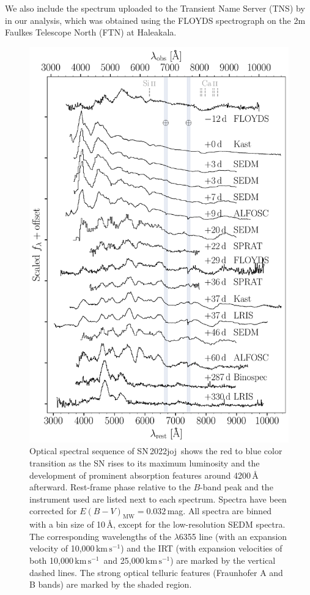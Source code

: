 \documentclass[twocolumn]{aastex631}
\newcommand{\sn}{SN\,2022joj}
\newcommand{\kms}{$\mathrm{km}\,\mathrm{s}^{-1}$}
\begin{document}
\begin{CJK*}{UTF8}{gbsn}
We also include the spectrum uploaded to the Transient Name Server (TNS) by \citet{Newsome_2022TNSCR} in our analysis, which was obtained using the FLOYDS spectrograph on the 2m Faulkes Telescope North (FTN) at Haleakala.

\begin{figure}
    \centering
    \includegraphics[width=\linewidth]{SN2022joj_spectral_sequence.pdf}
    \caption{Optical spectral sequence of \sn\ shows the red to blue color transition as the SN rises to its maximum luminosity and the development of prominent absorption features around 4200\,\r{A} afterward.
    Rest-frame phase relative to the $B$-band peak and the instrument used are listed next to each spectrum. Spectra have been corrected for ${E(B-V)_\mathrm{MW}} = 0.032$\,mag. All spectra are binned with a bin size of 10\,\AA, except for the low-resolution SEDM spectra. The corresponding wavelengths of the  $\lambda$6355 line (with an expansion velocity of 10,000\,\kms) and the  IRT (with expansion velocities of both 10,000\,\kms\ and 25,000\,\kms) are marked by the vertical dashed lines. The strong optical telluric features (Fraunhofer A and B bands) are marked by the shaded region.}

\end{figure}
\end{CJK*}
\end{document}

